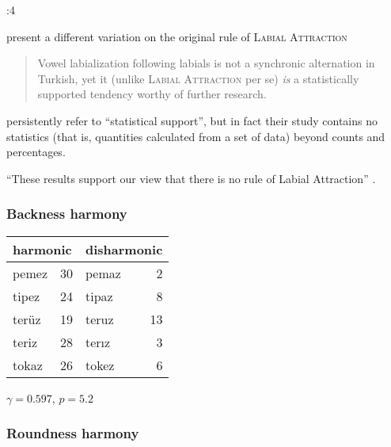 \citet{Zuraw2000}:4

\citet{Inkelas2001} present a different variation on the original rule of \textsc{Labial Attraction}


\begin{quote}
Vowel labialization following labials is not a synchronic alternation in Turkish, yet it (unlike \textsc{Labial Attraction} per se) \emph{is} a statistically supported tendency worthy of further research. \citep[][196, emphasis in original]{Inkelas2001}
\end{quote}

\noindent \citeauthor{Inkelas2001} persistently refer to ``statistical support'', but in fact their study contains no statistics (that is, quantities calculated from a set of data) beyond counts and percentages. 



``These results support our view that there is no rule of Labial Attraction'' \citep[][225]{Clements1982}.


\citet{Goodman1954}


\subsubsection{Backness harmony}


\begin{example}
\begin{tabular}{l r l r}
\toprule
\multicolumn{2}{l}{harmonic} & \multicolumn{2}{l}{disharmonic} \\
\midrule
{pemez} & 30            & {pemaz} & 2  \\
{tipez} & 24            & {tipaz} & 8  \\ 
{terüz} & 19            & {teruz} & 13 \\ %
{teriz} & 28            & {terız} & 3  \\
{tokaz} & 26            & {tokez} & 6  \\ %
\bottomrule
\end{tabular}
\end{example}

$\gamma = 0.597$, $p = 5.2$

\subsubsection{Roundness harmony}

